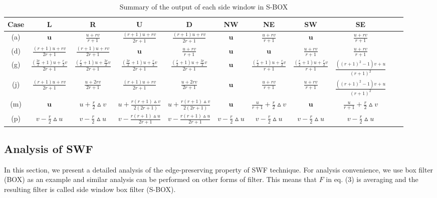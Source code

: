 \documentclass[10pt,twocolumn,letterpaper]{article}
\begin{document}
\begin{table*}
	{	\small
		\centering
		\caption{Summary of the output of each side window in S-BOX}
		\begin{tabular}{|c|c|c|c|c|c|c|c|c|c|c|}
			\hline
			Case&L&R&U&D&NW&NE&SW&SE\\
			\hline
			(a)&$\textbf{u}$&$\frac{u+rv}{r+1}$&$\frac{(r+1)u+rv}{2r+1}$&$\frac{(r+1)u+rv}{2r+1}$&$\textbf{u}$&$\frac{u+rv}{r+1}$&$\textbf{u}$&$\frac{u+rv}{r+1}$\\
			\hline
			(d)&$\frac{(r+1)u+rv}{2r+1}$&$\frac{(r+1)u+rv}{2r+1}$&$\textbf{u}$&$\frac{u+rv}{r+1}$&$\textbf{u}$&$\textbf{u}$&$\frac{u+rv}{r+1}$&$\frac{u+rv}{r+1}$\\
			\hline
			(g)&$\frac{(\frac{3r}{2}+1)u+\frac{r}{2}v}{2r+1}$&$\frac{(\frac{r}{2}+1)u+\frac{3r}{2}v}{2r+1}$&$\frac{(\frac{3r}{2}+1)u+\frac{r}{2}v}{2r+1}$&$\frac{(\frac{r}{2}+1)u+\frac{3r}{2}v}{2r+1}$&$\textbf{u}$&$\frac{(\frac{r}{2}+1)u+\frac{r}{2}v}{r+1}$&$\frac{(\frac{r}{2}+1)u+\frac{r}{2}v}{r+1}$&$\frac{((r+1)^2-1)v+u}{(r+1)^2}$\\
			\hline
			(j)&$\frac{(r+1)u+rv}{2r+1}$&$\frac{u+2rv}{2r+1}$&$\frac{(r+1)u+rv}{2r+1}$&$\frac{u+2rv}{2r+1}$&$\textbf{u}$&$\frac{u+rv}{r+1}$&$\frac{u+rv}{r+1}$&$\frac{((r+1)^2-1)v+u}{(r+1)^2}$\\
			\hline
			(m)&$\textbf{u}$&$u+\frac{r}{2}\vartriangle{v}$&$u+\frac{r(r+1)\vartriangle{v}}{2(2r+1)}$&$u+\frac{r(r+1)\vartriangle{v}}{2(2r+1)}$&$\textbf{u}$&$\frac{u}{r+1}+\frac{r}{2}\vartriangle{v}$&$\textbf{u}$&$\frac{u}{r+1}+\frac{r}{2}\vartriangle{v}$\\
			\hline
			(p)&$v-\frac{r}{2}\vartriangle{u}$&$v-\frac{r}{2}\vartriangle{u}$&$v-\frac{r(r+1)\vartriangle{u}}{2r+1}$&$v-\frac{r(r+1)\vartriangle{u}}{2r+1}$&{\tiny $v-\frac{r}{2}\vartriangle{u}$}&$v-\frac{r}{2}\vartriangle{u}$&$v-\frac{r}{2}\vartriangle{u}$&$v-\frac{r}{2}\vartriangle{u}$\\
			\hline
		\end{tabular}
		\label{outputsofsidewindow}
	}
\end{table*}

\subsection{Analysis of SWF}
In this section, we present a detailed analysis of the edge-preserving property of SWF technique. For analysis convenience, we use box filter (BOX) as an example and similar analysis can be performed on other forms of filter. This means that $F$ in eq. (3) is averaging and the resulting filter is called side window box filter (S-BOX).  
\end{document}
